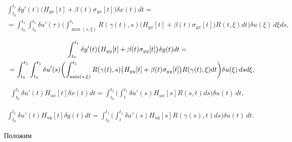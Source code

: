 \begin{multline}

  \label{mast:e32}

\int^{t_{1}}_{t_{0}} \delta y'(t)\bigl( H_{yx}[t] +\beta (t) \sigma_{yx}[t]\bigr) \delta x(t)dt= 

\\

=\int^{t_{1}}_{t_{0}} \int^{t_{1}}_{t_{0}} \delta u'(\tau)\biggl( \int^{t_{1}}_{\max (s, \xi)} R(\gamma(t),s) \bigl( H_{yx}[t] +\beta (t) \sigma_{yx}[t]\bigr) R(t,\xi)  dt   \biggr) \delta u(\xi)\, d\xi ds,

 \end{multline} 

\begin{multline}

  \label{mast:e32}

\int^{t_{1}}_{t_{0}} \delta y'(t)\bigl( H_{yy}[t] +\beta (t) \sigma_{yy}[t]\bigr) \delta y(t)dt= \\

=\int^{t_{1}}_{t_{0}} \int^{t_{1}}_{t_{0}} \delta u'(s)\biggl( 

\int^{t_{1}}_{\max (s, \xi)} R(\gamma(t),s) \bigl( H_{yy}[t] +\beta (t) \sigma_{yy}[t]\bigr) R(\gamma(t),\xi)

 dt   

 \biggr) \delta u(\xi)\, ds d\xi, \hspace{-5mm}

 \end{multline} 

\begin{gather}

\int^{t_{1}}_{t_{0}} \delta u'(t) H_{ux}[t] \delta x(t)dt= \int^{t_{1}}_{t_{0}}\biggl(  \int^{t_{1}}_{t} \delta u'(s) H_{ux}[s] R(s,t) ds  \biggr)  \delta u(t)\, dt,

  \label{mast:e32}

 \end{gather} 

 \begin{gather}

   \label{mast:e32}

\int^{t_{1}}_{t_{0}} \delta u'(t) H_{uy}[t] \delta y(t)dt= \int^{t_{1}}_{t_{0}}\biggl(  \int^{t_{1}}_{t} \delta u'(s) H_{uy}[s] R(\gamma(s),t) ds  \biggr)  \delta u(t)\, dt.

 \end{gather} 

Положим

